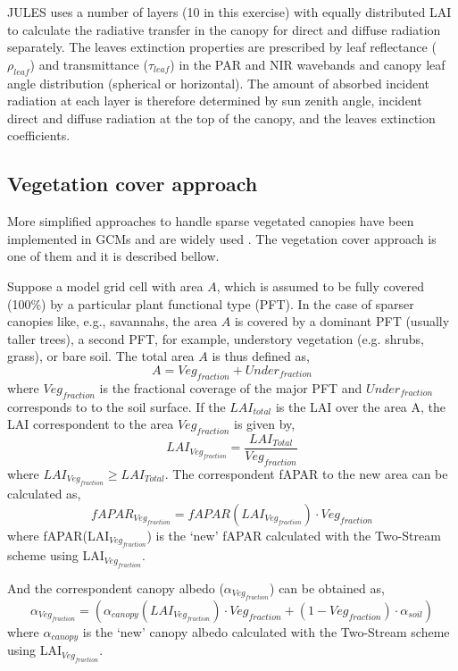 \documentclass[a4paper,11pt]{report}
\begin{document}
JULES uses a number of layers (10 in this exercise) with equally distributed LAI to calculate the radiative transfer in the canopy for direct and diffuse radiation separately. The leaves extinction properties are prescribed by leaf reflectance ($\rho_{leaf}$) and transmittance ($\tau_{leaf}$) in the PAR and NIR wavebands and canopy leaf angle distribution (spherical or horizontal). The amount of absorbed incident radiation at each layer is therefore determined by sun zenith angle, incident direct and diffuse radiation at the top of the canopy, and the leaves extinction coefficients. 

\subsection{Vegetation cover approach}
More simplified approaches to handle sparse vegetated canopies have been implemented in GCMs and are widely used \citep{Loew2014}. The vegetation cover approach is one of them and it is described bellow.

Suppose a model grid cell with area $A$, which is assumed to be fully covered (100\%) by a particular plant functional type (PFT). In the case of sparser canopies like, e.g., savannahs, the area $A$ is covered by a dominant PFT (usually taller trees), a second PFT, for example, understory vegetation (e.g. shrubs, grass), or bare soil. The total area $A$ is thus defined as,
\begin{equation}
A = Veg_{fraction} + Under_{fraction}
\label{equation:area}
\end{equation}
\noindent where $Veg_{fraction}$ is the fractional coverage of the major PFT and $Under_{fraction}$ corresponds to to the soil surface.  If the $LAI_{total}$ is the LAI over the area A, the LAI correspondent to the area $Veg_{fraction}$ is given by,
\begin{equation}
LAI_{Veg_{fraction}} = \frac{LAI_{Total}}{Veg_{fraction}}
\label{equation:laivegfraction}
\end{equation}
\noindent where $LAI_{Veg_{fraction}} \geq LAI_{Total}$. The correspondent fAPAR to the new area can be calculated as, 
\begin{equation}
fAPAR_{Veg_{fraction}} = fAPAR(LAI_{Veg_{fraction}})\cdot Veg_{fraction}
\label{equation:faparvegfraction}
\end{equation}
\noindent where fAPAR(LAI$_{Veg}_{fraction}$) is the `new' fAPAR calculated with the Two-Stream scheme using LAI$_{Veg}_{fraction}$. 

And the correspondent canopy albedo ($\alpha_{Veg}_{fraction}$) can be obtained as, 
\begin{equation}
\alpha_{Veg_{fraction}} = (\alpha_{canopy}(LAI_{Veg_{fraction}}) \cdot Veg_{fraction} + (1 - Veg_{fraction}) \cdot \alpha_{soil})
\label{equation:albedovegfraction}
\end{equation}
\noindent where $\alpha_{canopy}$ is the `new' canopy albedo calculated with the Two-Stream scheme using LAI$_{Veg}_{fraction}$. 
\end{document}
